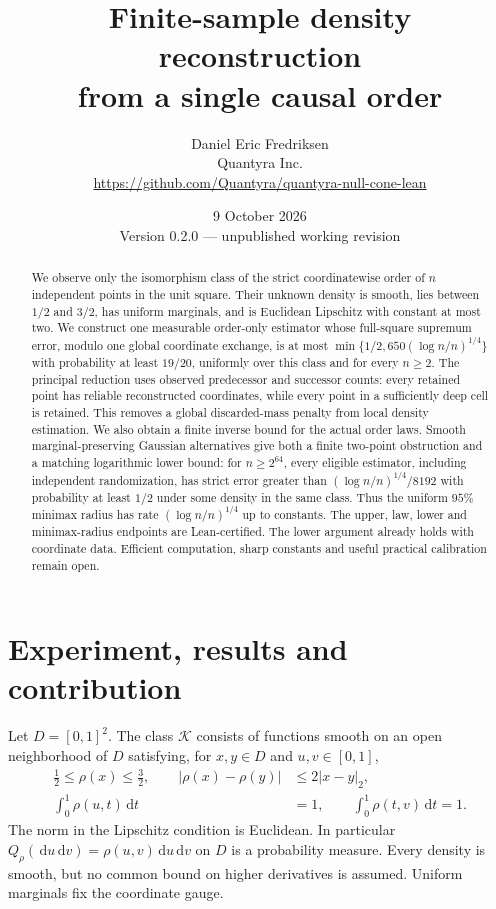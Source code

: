\documentclass[11pt]{article}
\title{Finite-sample density reconstruction\\from a single causal order}
\author{Daniel Eric Fredriksen\\Quantyra Inc.\\
\url{https://github.com/Quantyra/quantyra-null-cone-lean}}
\date{9 October 2026\\Version 0.2.0 --- unpublished working revision}
\theoremstyle{remark}
\newcommand{\K}{\mathcal K}
\newcommand{\dd}{\,\mathrm d}
\begin{document}
\maketitle
\begin{abstract}
We observe only the isomorphism class of the strict coordinatewise order
of $n$ independent points in the unit square. Their unknown density is
smooth, lies between $1/2$ and $3/2$, has uniform marginals, and is
Euclidean Lipschitz with constant at most two. We construct one measurable
order-only estimator whose full-square supremum error, modulo one global
coordinate exchange, is at most
$\min\{1/2,650(\log n/n)^{1/4}\}$ with probability at least $19/20$,
uniformly over this class and for every $n\ge2$.
The principal reduction uses observed predecessor and successor counts:
every retained point has reliable reconstructed coordinates, while every
point in a sufficiently deep cell is retained. This removes a global
discarded-mass penalty from local density estimation. We also obtain a
finite inverse bound for the actual order laws. Smooth marginal-preserving
Gaussian alternatives give both a finite two-point obstruction and a
matching logarithmic lower bound: for $n\ge2^{64}$, every eligible
estimator, including independent randomization, has strict error greater
than $(\log n/n)^{1/4}/8192$ with probability at least $1/2$ under some
density in the same class. Thus the uniform $95\%$ minimax radius has
rate $(\log n/n)^{1/4}$ up to constants. The upper, law, lower and
minimax-radius endpoints are Lean-certified. The lower argument already
holds with coordinate data. Efficient computation, sharp constants and
useful practical calibration remain open.
\end{abstract}

\section{Experiment, results and contribution}
\label{sec:results}
Let $D=[0,1]^2$. The class $\K$ consists of functions smooth on an open
neighborhood of $D$ satisfying, for $x,y\in D$ and $u,v\in[0,1]$,
\begin{align}
 \tfrac12\le\rho(x)\le\tfrac32,\qquad
 |\rho(x)-\rho(y)|&\le2|x-y|_2, \label{eq:class}\\
 \int_0^1\rho(u,t)\dd t&=1,\qquad
 \int_0^1\rho(t,v)\dd t=1. \nonumber
\end{align}
The norm in the Lipschitz condition is Euclidean. In particular
$Q_\rho(\dd u\dd v)=\rho(u,v)\dd u\dd v$ on $D$ is a probability measure.
Every density is smooth, but no common bound on higher derivatives is
assumed. Uniform marginals fix the coordinate gauge.
\end{document}
